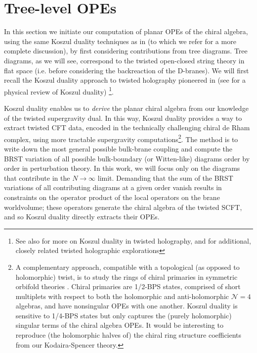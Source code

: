 \documentclass[../main.tex]{subfiles}
\begin{document}
\section{Tree-level OPEs}\label{sec:tree}

In this section we initiate our computation of planar OPEs of the chiral algebra, using the same Koszul duality techniques as in \cite{CP} (to which we refer for a more complete discussion), by first considering contributions from tree diagrams. Tree diagrams, as we will see, correspond to the twisted open-closed string theory in flat space (i.e. before considering the backreaction of the D-branes). We will first recall the Koszul duality approach to twisted holography pioneered in \cite{CostelloM2, CP} (see \cite{PW} for a physical review of Koszul duality) \footnote{See also \cite{Ishtiaque:2018str, Gaiotto:2019wcc, Oh:2020hph} for more on Koszul duality in twisted holography, and \cite{Mezei:2017kmw, Gaiotto:2020vqj,  Budzik:2021fyh, Oh:2021bwi} for additional, closely related twisted holographic explorations}. 

Koszul duality enables us to \textit{derive} the planar chiral algebra from our knowledge of the twisted supergravity dual. In this way, Koszul duality provides a way to extract twisted CFT data, encoded in the technically challenging chiral de Rham complex, using more tractable supergravity computations\footnote{A complementary approach, compatible with a topological (as opposed to holomorphic) twist, is to study the rings of chiral primaries in symmetric orbifold theories \cite{Li:2020zwo, Ashok:2023mow, Ashok:2023kkd}. Chiral primaries are 1/2-BPS states, comprised of short multiplets with respect to both the holomorphic and anti-holomorphic $\mathcal{N}=4$ algebras, and have nonsingular OPEs with one another. Koszul duality is sensitive to 1/4-BPS states but only captures the (purely holomorphic) singular terms of the chiral algebra OPEs. It would be interesting to reproduce (the holomorphic halves of) the chiral ring structure coefficients from our Kodaira-Spencer theory.}. The method is to write down the most general possible bulk-brane coupling and compute the BRST variation of all possible bulk-boundary (or Witten-like) diagrams order by order in perturbation theory. In this work, we will focus only on the diagrams that contribute in the $N \rightarrow \infty$ limit. Demanding that the sum of the BRST variations of all contributing diagrams at a given order vanish results in constraints on the operator product of the local operators on the brane worldvolume; these operators generate the chiral algebra of the twisted SCFT, and so Koszul duality directly extracts their OPEs.
\end{document}
